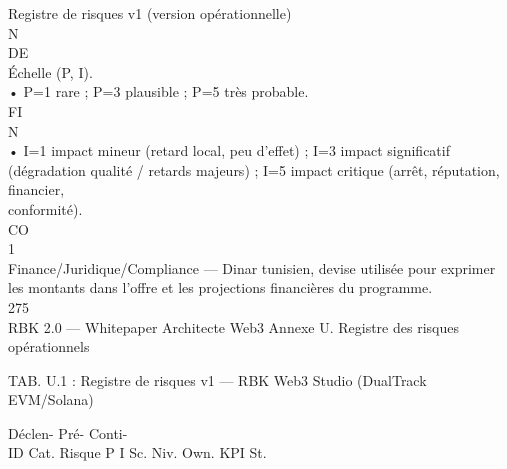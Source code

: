 \documentclass[12pt,landscape,a4paper]{article}
\begin{document}
Registre de risques v1 (version opérationnelle)\\
\vspace{0.5em}
\vspace{0.5em}
\vspace{0.5em}
\vspace{0.5em}
N\\
DE\\
Échelle (P, I).\\
• P=1 rare ; P=3 plausible ; P=5 très probable.\\
\vspace{0.5em}
\vspace{0.5em}
\vspace{0.5em}
\vspace{0.5em}
FI\\
N\\
• I=1 impact mineur (retard local, peu d’effet) ; I=3 impact significatif (dégradation qualité / retards majeurs) ; I=5 impact critique (arrêt, réputation, financier,\\
conformité).\\
CO\\
\vspace{0.5em}
\vspace{0.5em}
\vspace{0.5em}
\vspace{0.5em}
1\\
Finance/Juridique/Compliance — Dinar tunisien, devise utilisée pour exprimer les montants dans l’offre et les projections financières du programme.\\
\vspace{0.5em}
\vspace{0.5em}
275\\
RBK 2.0 — Whitepaper Architecte Web3                                                                                                           Annexe U. Registre des risques opérationnels\\
\vspace{0.5em}
\vspace{0.5em}
\vspace{0.5em}
\vspace{0.5em}
\begin{center}\begin{tabular}TAB. U.1 : Registre de risques v1 — RBK Web3 Studio (DualTrack EVM/Solana)\end{tabular}\end{center}
Déclen-          Pré-              Conti-\\
ID     Cat.     Risque          P I Sc. Niv. Own.                                                            KPI            St.\\
\end{document}
